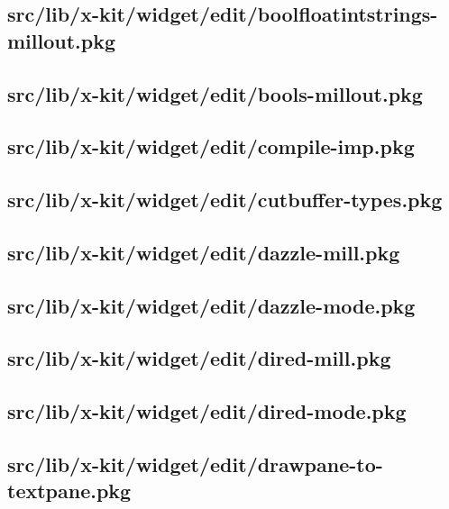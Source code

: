 \subsection{src/lib/x-kit/widget/edit/boolfloatintstrings-millout.pkg}


\subsection{src/lib/x-kit/widget/edit/bools-millout.pkg}


\subsection{src/lib/x-kit/widget/edit/compile-imp.pkg}


\subsection{src/lib/x-kit/widget/edit/cutbuffer-types.pkg}


\subsection{src/lib/x-kit/widget/edit/dazzle-mill.pkg}


\subsection{src/lib/x-kit/widget/edit/dazzle-mode.pkg}


\subsection{src/lib/x-kit/widget/edit/dired-mill.pkg}


\subsection{src/lib/x-kit/widget/edit/dired-mode.pkg}


\subsection{src/lib/x-kit/widget/edit/drawpane-to-textpane.pkg}


